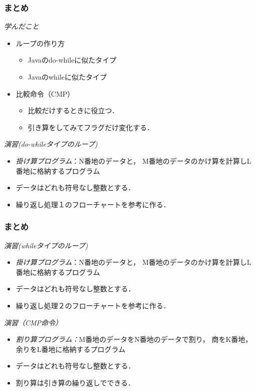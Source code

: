 \documentclass[handout]{beamer}        %
\begin{document}
\begin{frame}
  \frametitle{まとめ}
  \emph{学んだこと}
  \begin{itemize}
  \item ループの作り方
  \begin{itemize}
    \item Javaのdo-whileに似たタイプ
    \item Javaのwhileに似たタイプ
    \end{itemize}
  \item 比較命令（CMP）
  \begin{itemize}
    \item 比較だけするときに役立つ．
    \item 引き算をしてみてフラグだけ変化する．
    \end{itemize}
  \end{itemize}
  \vfill

  \emph{演習(do-whileタイプのループ)}
  \begin{itemize}
  \item \emph{掛け算プログラム}：N番地のデータと，
    M番地のデータのかけ算を計算しL番地に格納するプログラム
  \item データはどれも符号なし整数とする．
  \item \color{red}繰り返し処理１のフローチャートを参考に作る．
  \end{itemize}
  \vfill
\end{frame}

\begin{frame}
  \frametitle{まとめ}
  \emph{演習(whileタイプのループ)}
  \begin{itemize}
  \item \emph{掛け算プログラム}：N番地のデータと，
    M番地のデータのかけ算を計算しL番地に格納するプログラム
  \item データはどれも符号なし整数とする．
  \item \color{red}繰り返し処理２のフローチャートを参考に作る．
  \end{itemize}
  \vfill

  \emph{演習（CMP命令）}
  \begin{itemize}
  \item \emph{割り算プログラム：}M番地のデータをN番地のデータで割り，
    商をK番地，余りをL番地に格納するプログラム
  \item データはどれも符号なし整数とする．
  \item 割り算は引き算の繰り返しでできる．
  \end{itemize}
  \vfill
\end{frame}
\end{document}
